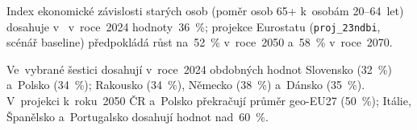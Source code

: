 Index ekonomické závislosti starých osob (poměr osob 65+ k~osobám 20--64~let) dosahuje v~ v~roce~2024 hodnoty~\SI{36}{\percent}; projekce Eurostatu (\texttt{proj\_23ndbi}, scénář baseline) předpokládá růst na~\SI{52}{\percent} v~roce~2050 a~\SI{58}{\percent} v~roce~2070.

Ve~vybrané šestici dosahují v~roce~2024 obdobných hodnot Slovensko (\SI{32}{\percent}) a~Polsko (\SI{34}{\percent}); Rakousko (\SI{34}{\percent}), Německo (\SI{38}{\percent}) a~Dánsko (\SI{35}{\percent}). V~projekci k~roku~2050 \ac{ČR} a~Polsko překračují průměr \acs{geo-EU27} (\SI{50}{\percent}); Itálie, Španělsko a~Portugalsko dosahují hodnot nad~\SI{60}{\percent}.


